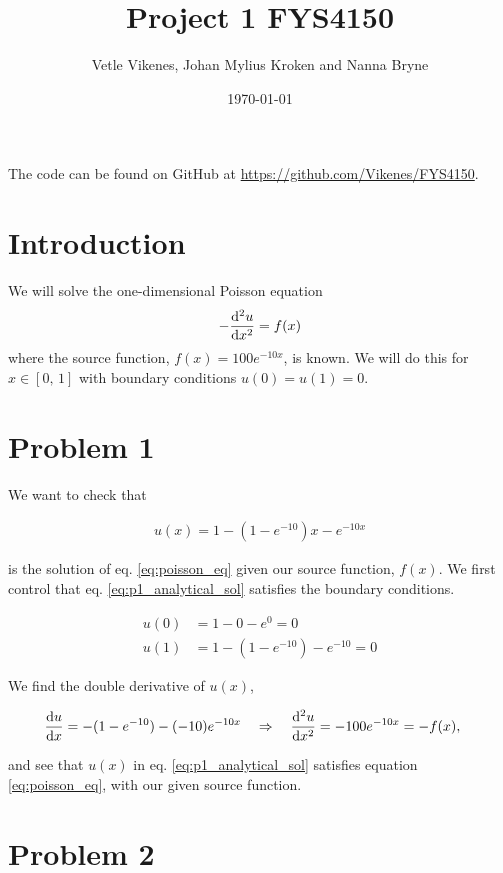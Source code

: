 \documentclass[english,notitlepage,nofootinbib]{revtex4-1}  %
\begin{document}
\title{Project 1 FYS4150} 
\author{Vetle Vikenes, Johan Mylius Kroken and Nanna Bryne}      
\date{\today}                 
\noaffiliation       

\maketitle 
The code can be found on GitHub at \url{https://github.com/Vikenes/FYS4150}.
    
\section*{Introduction}
We will solve the one-dimensional Poisson equation 
\begin{align} \label{eq:poisson_eq}
    - \dv[2]{u}{x}=f(x)
\end{align}
where the source function, $f(x)=100e^{-10x}$, is known. We will do this for $x\in[0,\,1]$ with boundary conditions $u(0)=u(1)=0$.

\section*{Problem 1}

We want to check that 

\begin{align}\label{eq:p1_analytical_sol}
    u(x) = 1 - (1-e^{-10})x - e^{-10x}
\end{align}

is the solution of eq. \eqref{eq:poisson_eq} given our source function, $f(x)$. We first control that eq. \eqref{eq:p1_analytical_sol} satisfies the boundary conditions. 

\begin{align*}
    u(0) &= 1 - 0 - e^{0} = 0 \\
    u(1) &= 1 - (1-e^{-10}) - e^{-10} = 0
\end{align*}
 
We find the double derivative of $u(x)$,

\begin{align*}
    \dv{u}{x} &= -(1-e^{-10}) - (-10)e^{-10x} \quad \Rightarrow \quad \dv[2]{u}{x} = -100e^{-10x}=-f(x),
\end{align*}

and see that $u(x)$ in eq. \eqref{eq:p1_analytical_sol} satisfies equation \eqref{eq:poisson_eq}, with our given source function.


\section*{Problem 2}
\end{document}
